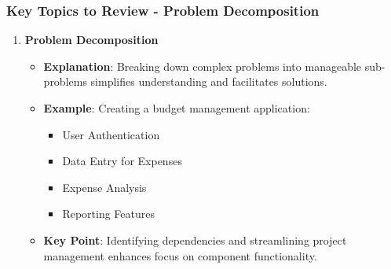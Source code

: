 \documentclass[aspectratio=169]{beamer}
\begin{document}
\begin{frame}[fragile]
    \frametitle{Key Topics to Review - Problem Decomposition}
    \begin{enumerate}
        \item \textbf{Problem Decomposition}
        \begin{itemize}
            \item \textbf{Explanation}: Breaking down complex problems into manageable sub-problems simplifies understanding and facilitates solutions.
            \item \textbf{Example}: Creating a budget management application:
            \begin{itemize}
                \item User Authentication
                \item Data Entry for Expenses
                \item Expense Analysis
                \item Reporting Features
            \end{itemize}
            \item \textbf{Key Point}: Identifying dependencies and streamlining project management enhances focus on component functionality.
        \end{itemize}
    \end{enumerate}
\end{frame}
\end{document}
